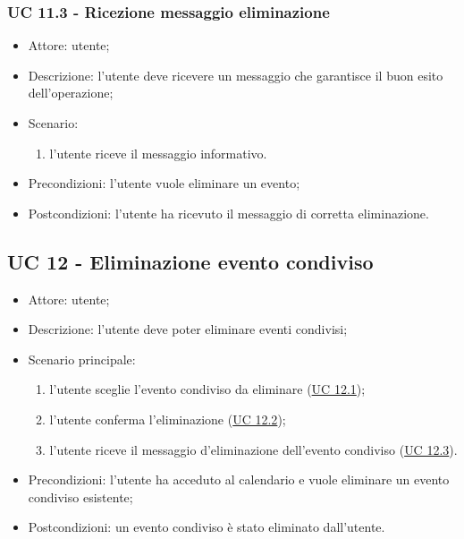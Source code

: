 \subsubsection{UC 11.3 - Ricezione messaggio eliminazione} \label{sec: UC 11.3}
\begin{itemize}
    \item Attore: utente;
    \item Descrizione: l'utente deve ricevere un messaggio che garantisce il buon esito dell'operazione;
    \item Scenario:
        \begin{enumerate}
        \item l'utente riceve il messaggio informativo.
        \end{enumerate}
    
    \item Precondizioni: l'utente vuole eliminare un evento;
    \item Postcondizioni: l'utente ha ricevuto il messaggio di corretta eliminazione.
\end{itemize}


\subsection{UC 12 - Eliminazione evento condiviso}
\begin{itemize}
    \item Attore: utente;
    \item Descrizione: l'utente deve poter eliminare eventi condivisi;
    \item Scenario principale:
        \begin{enumerate}
        \item l'utente sceglie l'evento condiviso da eliminare (\hyperref[sec: UC 12.1]{UC 12.1});
        \item l'utente conferma l'eliminazione (\hyperref[sec: UC 12.2]{UC 12.2});
        \item l'utente riceve il messaggio d'eliminazione dell'evento condiviso (\hyperref[sec: UC 12.3]{UC 12.3}).
        \end{enumerate}
    \item Precondizioni: l'utente ha acceduto al calendario e vuole eliminare un evento condiviso esistente;
    \item Postcondizioni: un evento condiviso è stato eliminato dall'utente.
\end{itemize}

